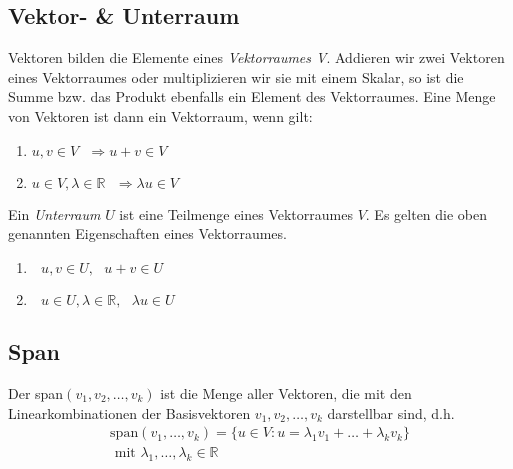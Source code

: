 \subsection{Vektor- \& Unterraum}
Vektoren bilden die Elemente eines \textit{Vektorraumes V}. Addieren wir zwei Vektoren eines Vektorraumes oder multiplizieren wir sie mit einem Skalar, so ist die Summe bzw. das Produkt ebenfalls ein Element des Vektorraumes.
\vspace{10pt}
\newline Eine Menge von Vektoren ist dann ein Vektorraum, wenn gilt:
\begin{enumerate}
\item $u, v \in V \text{ }\Rightarrow u+v \in V$
\item $u\in V, \lambda \in \mathbb{R} \text{ }\Rightarrow \lambda u \in V$
\end{enumerate}
\vspace{10pt}
Ein \textit{Unterraum} $U$ ist eine Teilmenge eines Vektorraumes $V$. Es gelten die oben genannten Eigenschaften eines Vektorraumes.
\vspace{10pt}
\begin{enumerate}
\item $\text{ }u, v \in U,\text{ } u+v \in U$
\item $\text{ }u \in U, \lambda \in \mathbb{R} ,\text{ }\lambda u \in U$
\end{enumerate}



\subsection{Span}
Der span$(v_1, v_2,\dots,v_k)$ ist die Menge aller Vektoren, die mit den Linearkombinationen der Basisvektoren $v_1, v_2, \dots, v_k$ darstellbar sind, d.h.
\begin{align*}
\text{span}(v_1,\dots,v_k) = \{u \in V : u = \lambda_1v_1+\dots+\lambda_kv_k\} \\
\text{ mit } \lambda_1,\dots,\lambda_k \in \mathbb{R}
\end{align*}



